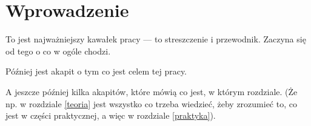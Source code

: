 \chapter{Wprowadzenie}

To jest najważniejszy kawałek pracy --- to streszczenie i przewodnik.
Zaczyna się od tego o co w ogóle chodzi.

Później jest akapit o tym co jest celem tej pracy.

A jeszcze później kilka akapitów, które mówią co jest, w którym rozdziale.
(Że np. w rozdziale \ref{teoria} jest wszystko co trzeba wiedzieć, żeby zrozumieć 
to, co jest w części praktycznej, a więc w rozdziale \ref{praktyka}).
